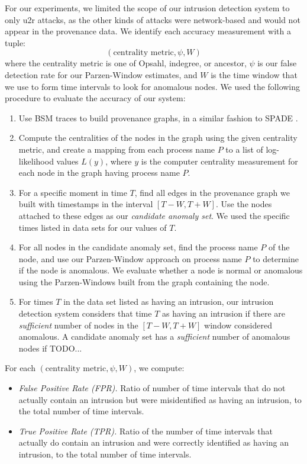 \documentclass[10pt,twocolumn]{article}
\begin{document}
For our experiments, we limited the scope of our intrusion detection system to only u2r attacks, as
the other kinds of attacks were network-based and would not appear in the provenance data. 
We identify each accuracy measurement with a tuple:
$$(\mbox{centrality metric}, \psi, W)$$
where the centrality metric is one of Opsahl, indegree, or ancestor, $\psi$ is our false detection rate for our Parzen-Window
estimates, and $W$ is the time window that we use to form time intervals to look for anomalous nodes. We used
the following procedure to evaluate the accuracy of our system: 
\begin{enumerate}
\item Use BSM traces to build provenance graphs, in a similar fashion to SPADE \cite{spade}. 
\item Compute the centralities of the nodes in the graph using the given centrality metric, and create a mapping from each process
name $P$ to a list of log-likelihood values $L(y)$, where $y$ is the computer centrality measurement for each node in the graph having process name $P$.
\item For a specific moment in time $T$, find all edges in the provenance graph we built with timestamps in the interval $[T - W, T + W]$. 
Use the nodes attached to these edges as our {\em candidate anomaly set}. We used the specific times listed in data sets for our values of $T$.
\item For all nodes in the candidate anomaly set, find the process name $P$ of the node, and use our Parzen-Window approach on process
name $P$ to determine if the node is anomalous. We evaluate whether a node is normal or anomalous using the Parzen-Windows built from the graph
containing the node.
\item For times $T$ in the data set listed as having an intrusion, our intrusion detection system considers that time $T$ as having an intrusion
if there are {\em sufficient} number of nodes in the $[T - W, T + W]$ window considered anomalous. A candidate anomaly set has a 
{\em sufficient} number of anomalous nodes if TODO...
\end{enumerate}

For each $(\mbox{centrality metric}, \psi, W)$, we compute:
\begin{itemize}
\item {\em False Positive Rate (FPR).} Ratio of number of time intervals that do not actually contain an intrusion
but were misidentified as having an intrusion, to the total number of time intervals.
\item {\em True Positive Rate (TPR).} Ratio of the number of time intervals that actually do contain an intrusion
and were correctly identified as having an intrusion, to the total number of time intervals.
\end{itemize}
\end{document}
